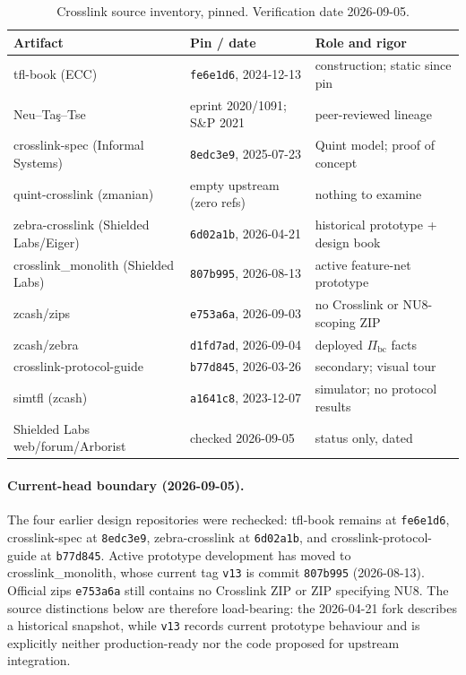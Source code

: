 \documentclass[11pt,a4paper]{article}
\theoremstyle{definition}
\begin{document}
\begin{table}[htbp]
\centering
\small
\begin{tabular}{@{}lll@{}}
\toprule
Artifact & Pin / date & Role and rigor \\
\midrule
tfl-book (ECC)
  & \texttt{fe6e1d6}, 2024-12-13 & construction; static since pin \\
Neu--Ta\c{s}--Tse
  & eprint 2020/1091; S\&P 2021 & peer-reviewed lineage \\
crosslink-spec (Informal Systems)
  & \texttt{8edc3e9}, 2025-07-23 & Quint model; proof of concept \\
quint-crosslink (zmanian)
  & empty upstream (zero refs)  & nothing to examine \\
zebra-crosslink (Shielded Labs/Eiger)
  & \texttt{6d02a1b}, 2026-04-21 & historical prototype + design book \\
crosslink\_monolith (Shielded Labs)
  & \texttt{807b995}, 2026-08-13 & active feature-net prototype \\
zcash/zips
  & \texttt{e753a6a}, 2026-09-03 & no Crosslink or NU8-scoping ZIP \\
zcash/zebra
  & \texttt{d1fd7ad}, 2026-09-04 & deployed $\Pi_{\mathrm{bc}}$ facts \\
crosslink-protocol-guide
  & \texttt{b77d845}, 2026-03-26 & secondary; visual tour \\
simtfl (zcash)
  & \texttt{a1641c8}, 2023-12-07 & simulator; no protocol results \\
Shielded Labs web/forum/Arborist
  & checked 2026-09-05           & status only, dated \\
\bottomrule
\end{tabular}
\caption{Crosslink source inventory, pinned. Verification date
2026-09-05.}
\label{tab:xl-sources}
\end{table}

\paragraph{Current-head boundary (2026-09-05).} The four earlier design
repositories were rechecked: \textsf{tfl-book} remains at
\texttt{fe6e1d6}, \textsf{crosslink-spec} at \texttt{8edc3e9},
\textsf{zebra-crosslink} at \texttt{6d02a1b}, and
\textsf{crosslink-protocol-guide} at \texttt{b77d845}. Active prototype
development has moved to \textsf{crosslink\_monolith}, whose current tag
\texttt{v13} is commit \texttt{807b995} (2026-08-13). Official
\textsf{zips} \texttt{e753a6a} still contains no Crosslink ZIP or ZIP
specifying NU8.
The source distinctions below are therefore load-bearing: the 2026-04-21
fork describes a historical snapshot, while \texttt{v13} records current
prototype behaviour and is explicitly neither production-ready nor the
code proposed for upstream integration.
\end{document}
